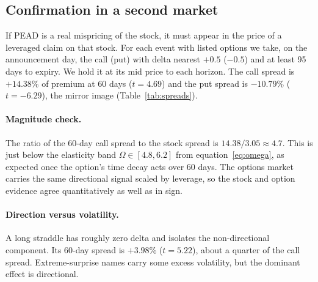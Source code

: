 \documentclass[11pt]{article}
\theoremstyle{definition}
\newcommand{\1}{\mathbf{1}}
\begin{document}
\subsection{Confirmation in a second market}

If PEAD is a real mispricing of the stock, it must appear in the price of a leveraged claim
on that stock. For each event with listed options we take, on the announcement day, the call
(put) with delta nearest $+0.5$ ($-0.5$) and at least 95 days to expiry. We hold it at its mid
price to each horizon. The call spread is $+14.38\%$ of premium at 60 days ($t=4.69$) and the
put spread is $-10.79\%$ ($t=-6.29$), the mirror image (Table~\ref{tab:spreads}).

\paragraph{Magnitude check.} The ratio of the 60-day call spread to the stock spread is
$14.38/3.05\approx4.7$. This is just below the elasticity band $\Omega\in[4.8,6.2]$ from
equation~\eqref{eq:omega}, as expected once the option's time decay acts over 60 days. The
options market carries the same directional signal scaled by leverage, so the stock and
option evidence agree quantitatively as well as in sign.

\paragraph{Direction versus volatility.} A long straddle has roughly zero delta and isolates
the non-directional component. Its 60-day spread is $+3.98\%$ ($t=5.22$), about a quarter of
the call spread. Extreme-surprise names carry some excess volatility, but the dominant effect
is directional.
\end{document}
